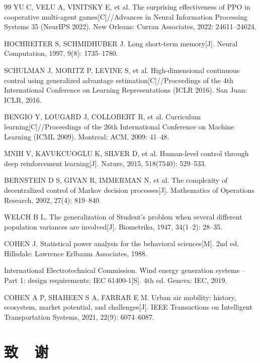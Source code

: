 \documentclass[12pt,a4paper,UTF8]{ctexbook}
\begin{document}
\begin{thebibliography}{99}
 YU C, VELU A, VINITSKY E, et al. The surprising effectiveness of PPO in cooperative multi-agent games[C]//Advances in Neural Information Processing Systems 35 (NeurIPS 2022). New Orleans: Curran Associates, 2022: 24611--24624.

 HOCHREITER S, SCHMIDHUBER J. Long short-term memory[J]. Neural Computation, 1997, 9(8): 1735--1780.

 SCHULMAN J, MORITZ P, LEVINE S, et al. High-dimensional continuous control using generalized advantage estimation[C]//Proceedings of the 4th International Conference on Learning Representations (ICLR 2016). San Juan: ICLR, 2016.

 BENGIO Y, LOUGARD J, COLLOBERT R, et al. Curriculum learning[C]//Proceedings of the 26th International Conference on Machine Learning (ICML 2009). Montreal: ACM, 2009: 41--48.

 MNIH V, KAVUKCUOGLU K, SILVER D, et al. Human-level control through deep reinforcement learning[J]. Nature, 2015, 518(7540): 529--533.

 BERNSTEIN D S, GIVAN R, IMMERMAN N, et al. The complexity of decentralized control of Markov decision processes[J]. Mathematics of Operations Research, 2002, 27(4): 819--840.

 WELCH B L. The generalization of Student's problem when several different population variances are involved[J]. Biometrika, 1947, 34(1--2): 28--35.

 COHEN J. Statistical power analysis for the behavioral sciences[M]. 2nd ed. Hillsdale: Lawrence Erlbaum Associates, 1988.

 International Electrotechnical Commission. Wind energy generation systems -- Part 1: design requirements: IEC 61400-1[S]. 4th ed. Geneva: IEC, 2019.

 COHEN A P, SHAHEEN S A, FARRAR E M. Urban air mobility: history, ecosystem, market potential, and challenges[J]. IEEE Transactions on Intelligent Transportation Systems, 2021, 22(9): 6074--6087.

\end{thebibliography}

\chapter*{致\ \ 谢}
\end{document}
